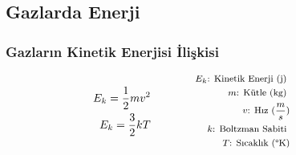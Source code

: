 \subsection{Gazlarda Enerji}

\subsubsection*{Gazların Kinetik Enerjisi İlişkisi}
\begin{equation}
    \begin{aligned}
        E_k = \frac{1}{2}mv^2 \\
        E_k = \frac{3}{2}kT 
    \end{aligned} \qquad \qquad \parbox{4cm}{\footnotesize$\begin{aligned}
        E_k\text{: Kinetik  Enerji (j) } \\
        m\text{: Kütle (kg) } \\ 
        v\text{: Hız } (\frac{m}{s}) \\
        k\text{: Boltzman Sabiti } \\
        T\text{: Sıcaklık } (\text{\textdegree K})
\end{aligned}$}
\end{equation}
